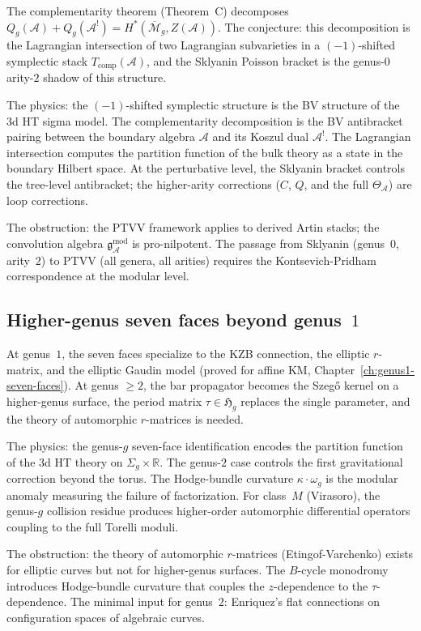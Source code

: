 \documentclass[11pt]{article}
\newcommand{\cA}{\mathcal{A}}
\newcommand{\cM}{\mathcal{M}}
\newcommand{\fH}{\mathfrak{H}}
\newcommand{\bR}{\mathbb{R}}
\newcommand{\gAmod}{\mathfrak{g}^{\mathrm{mod}}_\cA}
\begin{document}
The complementarity theorem (Theorem~C) decomposes
$Q_g(\cA) + Q_g(\cA^!) = H^*(\overline{\cM}_g, Z(\cA))$.
The conjecture: this decomposition is the Lagrangian intersection of two
Lagrangian subvarieties in a $(-1)$-shifted symplectic stack
$T_{\mathrm{comp}}(\cA)$, and the Sklyanin Poisson bracket is the
genus-$0$ arity-$2$ shadow of this structure.

The physics: the $(-1)$-shifted symplectic structure is the BV structure
of the 3d HT sigma model.  The complementarity decomposition is the BV
antibracket pairing between the boundary algebra $\cA$ and its Koszul
dual $\cA^!$.  The Lagrangian intersection computes the partition
function of the bulk theory as a state in the boundary Hilbert space.
At the perturbative level, the Sklyanin bracket controls the tree-level
antibracket; the higher-arity corrections ($C$, $Q$, and the full
$\Theta_\cA$) are loop corrections.

The obstruction: the PTVV framework applies to derived Artin stacks; the
convolution algebra $\gAmod$ is pro-nilpotent.  The passage from
Sklyanin (genus~$0$, arity~$2$) to PTVV (all genera, all arities)
requires the Kontsevich-Pridham correspondence at the modular level.

\subsection{Higher-genus seven faces beyond genus~$1$}

At genus~$1$, the seven faces specialize to the KZB connection, the
elliptic $r$-matrix, and the elliptic Gaudin model (proved for affine
KM, Chapter~\ref{ch:genus1-seven-faces}).  At genus $\geq 2$, the bar
propagator becomes the Szeg\H{o} kernel on a higher-genus surface, the
period matrix $\tau \in \fH_g$ replaces the single parameter, and the
theory of automorphic $r$-matrices is needed.

The physics: the genus-$g$ seven-face identification encodes the
partition function of the 3d HT theory on $\Sigma_g \times \bR$.  The
genus-$2$ case controls the first gravitational correction beyond the
torus.  The Hodge-bundle curvature $\kappa \cdot \omega_g$ is the
modular anomaly measuring the failure of factorization.  For class~$M$
(Virasoro), the genus-$g$ collision residue produces higher-order
automorphic differential operators coupling to the full Torelli moduli.

The obstruction: the theory of automorphic $r$-matrices (Etingof-Varchenko)
exists for elliptic curves but not for higher-genus surfaces.  The
$B$-cycle monodromy introduces Hodge-bundle curvature that couples the
$z$-dependence to the $\tau$-dependence.  The minimal input for genus~$2$:
Enriquez's flat connections on configuration spaces of algebraic curves.
\end{document}
